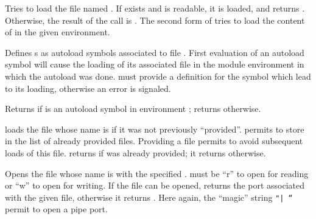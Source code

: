 \begin{entry}{%
}
\saut
Tries to load the file named . If  exists and is
readable, it is loaded, and  returns {\schtrue}. 
Otherwise, the result of the call is {\schfalse}.
The second form of  tries to load the content of  
in the given  environment. 
\end{entry}

\begin{entry}{%
}
\saut
Defines s as autoload symbols associated to file
. 
First evaluation of an autoload symbol will cause the loading of its
associated file in the module environment in which the autoload was done. 
 must provide a definition for the symbol which
lead to its loading, otherwise an error is signaled.
\end{entry}

\begin{entry}{%
}
\saut
Returns {\schtrue} if  is an autoload symbol in  
environment ; returns {\schfalse} otherwise.
\end{entry}

\begin{entry}{%
}
\saut
{} loads the file whose name is  if it was not
previously ``provided''. permits to store  in
the list of already provided files. Providing a file permits to avoid
subsequent loads of this file.  returns {\schtrue} if
 was already provided; it returns {\schfalse} otherwise.
\end{entry}

\begin{entry}{%
}
\saut
Opens the file whose name is  with the specified
.  must be ``r'' to open for reading or ``w''
to open for writing. If the file can be opened, 
returns the port associated with the given file, otherwise it returns
{\schfalse}. Here again, the ``magic'' string {\tt "|~``} permit to
open a pipe port.
\end{entry}

